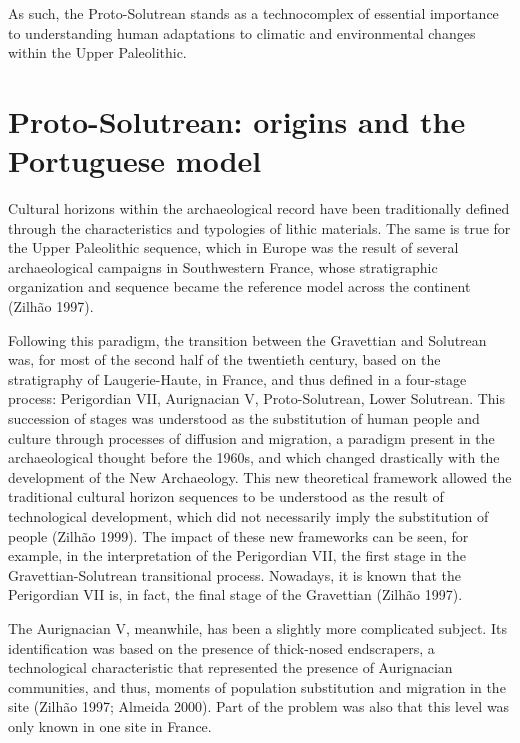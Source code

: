 \documentclass[12pt,twoside]{reedthesis}
\begin{document}
As such, the Proto-Solutrean stands as a technocomplex of essential importance to understanding human adaptations to climatic and environmental changes within the Upper Paleolithic.

\hypertarget{proto-solutrean-origins-and-the-portuguese-model}{%
\section{Proto-Solutrean: origins and the Portuguese model}\label{proto-solutrean-origins-and-the-portuguese-model}}

Cultural horizons within the archaeological record have been traditionally defined through the characteristics and typologies of lithic materials. The same is true for the Upper Paleolithic sequence, which in Europe was the result of several archaeological campaigns in Southwestern France, whose stratigraphic organization and sequence became the reference model across the continent (Zilhão 1997).

Following this paradigm, the transition between the Gravettian and Solutrean was, for most of the second half of the twentieth century, based on the stratigraphy of Laugerie-Haute, in France, and thus defined in a four-stage process: Perigordian VII, Aurignacian V, Proto-Solutrean, Lower Solutrean. This succession of stages was understood as the substitution of human people and culture through processes of diffusion and migration, a paradigm present in the archaeological thought before the 1960s, and which changed drastically with the development of the New Archaeology. This new theoretical framework allowed the traditional cultural horizon sequences to be understood as the result of technological development, which did not necessarily imply the substitution of people (Zilhão 1999). The impact of these new frameworks can be seen, for example, in the interpretation of the Perigordian VII, the first stage in the Gravettian-Solutrean transitional process. Nowadays, it is known that the Perigordian VII is, in fact, the final stage of the Gravettian (Zilhão 1997).

The Aurignacian V, meanwhile, has been a slightly more complicated subject. Its identification was based on the presence of thick-nosed endscrapers, a technological characteristic that represented the presence of Aurignacian communities, and thus, moments of population substitution and migration in the site (Zilhão 1997; Almeida 2000). Part of the problem was also that this level was only known in one site in France.
\end{document}
